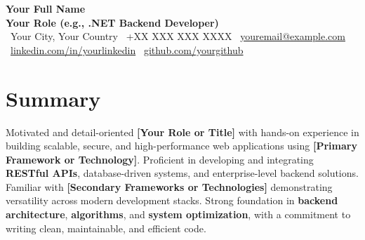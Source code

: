\begin{center}
    {\Huge \textbf{Your Full Name}} \\[4pt]
    {\large \textbf{Your Role (e.g., .NET Backend Developer)}} \\[6pt]

    \faMapMarker\ Your City, Your Country \quad
    \faPhone\ +XX XXX XXX XXXX \quad
    \faEnvelope\ \href{mailto:youremail@example.com}{youremail@example.com} \\[4pt]

    \faLinkedin\ \href{https://linkedin.com/in/yourlinkedin}{linkedin.com/in/yourlinkedin} \quad
    \faGithub\ \href{https://github.com/yourgithub}{github.com/yourgithub}
\end{center}



\section{Summary}
Motivated and detail-oriented \textbf{[Your Role or Title]} with hands-on experience in building scalable, secure, and high-performance web applications using \textbf{[Primary Framework or Technology]}.  
Proficient in developing and integrating \textbf{RESTful APIs}, database-driven systems, and enterprise-level backend solutions.  
Familiar with \textbf{[Secondary Frameworks or Technologies]} demonstrating versatility across modern development stacks.  
Strong foundation in \textbf{backend architecture}, \textbf{algorithms}, and \textbf{system optimization}, with a commitment to writing clean, maintainable, and efficient code.
